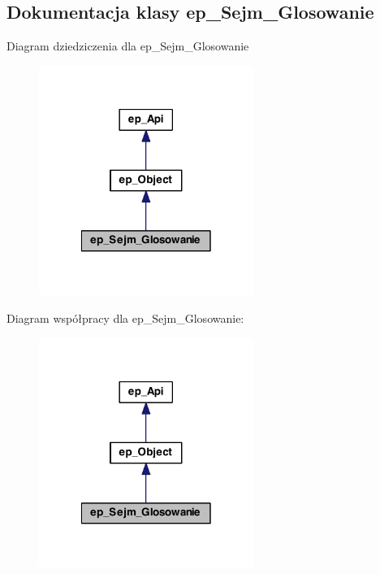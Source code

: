 \hypertarget{classep___sejm___glosowanie}{\subsection{Dokumentacja klasy ep\-\_\-\-Sejm\-\_\-\-Glosowanie}
\label{classep___sejm___glosowanie}
}


Diagram dziedziczenia dla ep\-\_\-\-Sejm\-\_\-\-Glosowanie\nopagebreak
\begin{figure}[H]
\begin{center}
\leavevmode
\includegraphics[width=198pt]{classep___sejm___glosowanie__inherit__graph}
\end{center}
\end{figure}


Diagram współpracy dla ep\-\_\-\-Sejm\-\_\-\-Glosowanie\-:\nopagebreak
\begin{figure}[H]
\begin{center}
\leavevmode
\includegraphics[width=198pt]{classep___sejm___glosowanie__coll__graph}
\end{center}
\end{figure}
